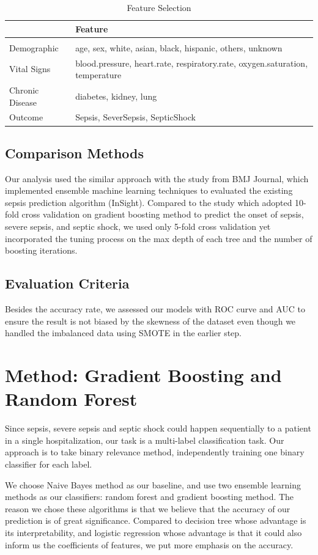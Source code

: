 \documentclass[twoside,11pt]{article}
\begin{document}
\begin{table}[htbp]
	\centering 
	\begin{tabular}{|p{2.7cm}|p{13cm}|}
		\hline 
		& Feature\\ 
		\hline \\[-11pt]
		Demographic &  age, sex, white, asian, black, hispanic, others, unknown\\ 
		Vital Signs & blood.pressure, heart.rate, respiratory.rate, oxygen.saturation, temperature\\
		Chronic Disease & diabetes, kidney, lung\\
		Outcome & Sepsis, SeverSepsis, SepticShock\\
		\hline 
	\end{tabular}
	\label{tab:example} 
	\caption{Feature Selection} 
\end{table}

\subsection{Comparison Methods}
Our analysis used the similar approach with the study from BMJ Journal\cite{cite6}, which implemented ensemble machine learning techniques to evaluated the existing sepsis prediction algorithm (InSight). Compared to the study which adopted 10-fold cross validation on gradient boosting method to predict the onset of sepsis, severe sepsis, and septic shock, we used only 5-fold cross validation yet incorporated the tuning process on the max depth of each tree and the number of boosting iterations. 
\subsection{Evaluation Criteria}
Besides the accuracy rate, we assessed our models with ROC curve and AUC to ensure the result is not biased by the skewness of the dataset even though we handled the imbalanced data using SMOTE in the earlier step. 

\section{Method: Gradient Boosting and Random Forest} \label{model}
Since sepsis, severe sepsis and septic shock could happen sequentially to a patient in a single hospitalization, our task is a multi-label classification task. Our approach is to take binary relevance method, independently training one binary classifier for each label. 

We choose Naive Bayes method as our baseline, and use two ensemble learning methods as our classifiers: random forest and gradient boosting method. The reason we chose these algorithms is that we believe that the accuracy of our prediction is of great significance. Compared to decision tree whose advantage is its interpretability, and logistic regression whose advantage is that it could also inform us the coefficients of features, we put more emphasis on the accuracy. 
\end{document}
